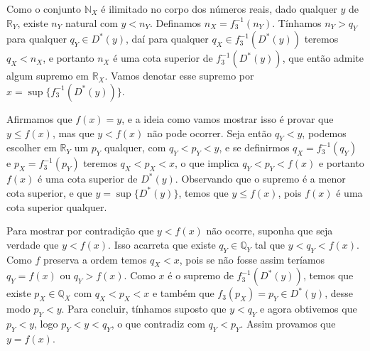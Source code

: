 \documentclass[../main.tex]{subfiles}
\begin{document}
\begin{dem}
\begin{enumerate}
\begin{enumerate}
            Como o conjunto $\mathbb{N}_X$ é ilimitado no corpo dos números reais, dado qualquer $y$ de $\mathbb{R}_Y$, existe $n_Y$ natural com $y < n_Y$.
            Definamos $n_X = f_3^{-1}(n_Y)$. Tínhamos $n_Y > q_Y$ para qualquer $q_Y \in D^*(y)$, daí para qualquer $q_X \in f_3^{-1}(D^*(y))$ teremos 
            $q_X < n_X$, e portanto $n_X$ é uma cota superior de $f_3^{-1}(D^*(y))$, que então admite algum supremo em $\mathbb{R}_X$. Vamos denotar esse supremo por $x = \sup\{f_3^{-1}(D^*(y))\}$. 

            Afirmamos que $f(x) = y$, e a ideia como vamos mostrar isso é provar que $y \leq f(x)$, mas que $y < f(x)$ não pode ocorrer.
            Seja então $q_Y < y$, podemos escolher em $\mathbb{R}_Y$ um $p_Y$ qualquer, com $q_Y < p_Y < y$, e se definirmos $q_X = f_3^{-1}(q_Y)$ e 
            $p_X = f_3^{-1}(p_Y)$ teremos $q_X < p_X < x$, o que implica $q_Y < p_Y < f(x)$ e portanto $f(x)$ é uma cota superior de $D^*(y)$. Observando que o supremo é a menor cota superior, e que $y = \sup\{D^*(y)\}$, temos que $y \leq f(x)$, pois $f(x)$ é uma cota superior qualquer.

            Para mostrar por contradição que $y < f(x)$ não ocorre, suponha que seja verdade que $y<f(x)$. Isso acarreta que existe $q_Y \in \mathbb{Q}_Y$
            tal que $y < q_Y < f(x)$. Como $f$ preserva a ordem temos $q_X < x$, pois se não fosse assim teríamos $q_Y = f(x) $ ou $ q_Y > f(x)$.
            Como $x$ é o supremo de $f_3^{-1}(D^*(y))$, temos que existe $p_X \in \mathbb{Q}_X$ com $q_X < p_X < x$ e também que $f_3(p_X) = p_Y \in D^*(y)$, desse modo $p_Y < y$. Para concluir, tínhamos suposto que $y < q_Y$ e agora obtivemos que $p_Y < y$, logo $p_Y < y < q_Y$, o que contradiz com $q_Y < p_Y$. Assim provamos que $y = f(x)$.


\end{enumerate}
\end{enumerate}
\end{dem}
\end{document}
